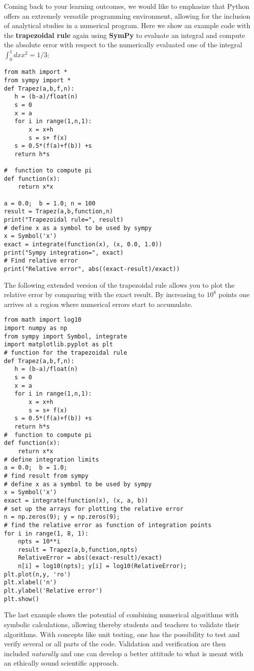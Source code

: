 \documentclass[graybox,envcountchap,sectrefs]{svmult}
\begin{document}
Coming back to your learning outcomes, we would like to emphasize that 
Python offers an  extremely versatile programming  environment, allowing for
the inclusion of analytical studies in a numerical program. Here we show an
example code with the \textbf{trapezoidal rule} again using \textbf{SymPy} to evaluate an integral and compute the absolute error
with respect to the numerically evaluated one of the integral
$\int_0^1 dx x^2 = 1/3$:
\begin{lstlisting}
from math import *
from sympy import *
def Trapez(a,b,f,n):
   h = (b-a)/float(n)
   s = 0
   x = a
   for i in range(1,n,1):
       x = x+h
       s = s+ f(x)
   s = 0.5*(f(a)+f(b)) +s
   return h*s

#  function to compute pi
def function(x):
    return x*x

a = 0.0;  b = 1.0; n = 100
result = Trapez(a,b,function,n)
print("Trapezoidal rule=", result)
# define x as a symbol to be used by sympy
x = Symbol('x')
exact = integrate(function(x), (x, 0.0, 1.0))
print("Sympy integration=", exact)
# Find relative error
print("Relative error", abs((exact-result)/exact))
\end{lstlisting}
The following extended version of the trapezoidal rule allows you  to plot the relative error by comparing with the exact result. By increasing to $10^8$ points one arrives at a region where numerical errors start to accumulate.
\begin{lstlisting}
from math import log10
import numpy as np
from sympy import Symbol, integrate
import matplotlib.pyplot as plt
# function for the trapezoidal rule
def Trapez(a,b,f,n):
   h = (b-a)/float(n)
   s = 0
   x = a
   for i in range(1,n,1):
       x = x+h
       s = s+ f(x)
   s = 0.5*(f(a)+f(b)) +s
   return h*s
#  function to compute pi
def function(x):
    return x*x
# define integration limits
a = 0.0;  b = 1.0;
# find result from sympy
# define x as a symbol to be used by sympy
x = Symbol('x')
exact = integrate(function(x), (x, a, b))
# set up the arrays for plotting the relative error
n = np.zeros(9); y = np.zeros(9);
# find the relative error as function of integration points
for i in range(1, 8, 1):
    npts = 10**i
    result = Trapez(a,b,function,npts)
    RelativeError = abs((exact-result)/exact)
    n[i] = log10(npts); y[i] = log10(RelativeError);
plt.plot(n,y, 'ro')
plt.xlabel('n')
plt.ylabel('Relative error')
plt.show()
\end{lstlisting}


The last example shows the potential of combining numerical algorithms with symbolic calculations, allowing thereby students and teachers to validate   their  algorithms. With concepts like unit testing, one has the possibility to test and verify several or all parts of the code. Validation and verification are then included \emph{naturally} and one can develop a better attitude to what is meant with an ethically sound scientific approach.
\end{document}
